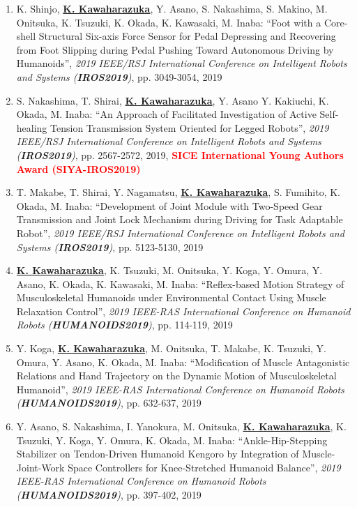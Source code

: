 \documentclass[letterpaper]{article}
\begin{document}
\begin{enumerate}
\item K. Shinjo, \underline{\textbf{K. Kawaharazuka}}, Y. Asano, S. Nakashima, S. Makino, M. Onitsuka, K. Tsuzuki, K. Okada, K. Kawasaki, M. Inaba: ``Foot with a Core-shell Structural Six-axis Force Sensor for Pedal Depressing and Recovering from Foot Slipping during Pedal Pushing Toward Autonomous Driving by Humanoids'', \textit{2019 IEEE/RSJ International Conference on Intelligent Robots and Systems (\textit{\textbf{IROS2019}})}, pp. 3049-3054, 2019
\item S. Nakashima, T. Shirai, \underline{\textbf{K. Kawaharazuka}}, Y. Asano Y. Kakiuchi, K. Okada, M. Inaba: ``An Approach of Facilitated Investigation of Active Self-healing Tension Transmission System Oriented for Legged Robots'', \textit{2019 IEEE/RSJ International Conference on Intelligent Robots and Systems (\textit{\textbf{IROS2019}})}, pp. 2567-2572, 2019, \textbf{\textcolor{red}{SICE International Young Authors Award (SIYA-IROS2019)}}
\item T. Makabe, T. Shirai, Y. Nagamatsu, \underline{\textbf{K. Kawaharazuka}}, S. Fumihito, K. Okada, M. Inaba: ``Development of Joint Module with Two-Speed Gear Transmission and Joint Lock Mechanism during Driving for Task Adaptable Robot'', \textit{2019 IEEE/RSJ International Conference on Intelligent Robots and Systems (\textit{\textbf{IROS2019}})}, pp. 5123-5130, 2019
\item \underline{\textbf{K. Kawaharazuka}}, K. Tsuzuki, M. Onitsuka, Y. Koga, Y. Omura, Y. Asano, K. Okada, K. Kawasaki, M. Inaba: ``Reflex-based Motion Strategy of Musculoskeletal Humanoids under Environmental Contact Using Muscle Relaxation Control'', \textit{2019 IEEE-RAS International Conference on Humanoid Robots (\textit{\textbf{HUMANOIDS2019}})}, pp. 114-119, 2019
\item Y. Koga, \underline{\textbf{K. Kawaharazuka}}, M. Onitsuka, T. Makabe, K. Tsuzuki, Y. Omura, Y. Asano, K. Okada, M. Inaba: ``Modification of Muscle Antagonistic Relations and Hand Trajectory on the Dynamic Motion of Musculoskeletal Humanoid'', \textit{2019 IEEE-RAS International Conference on Humanoid Robots (\textit{\textbf{HUMANOIDS2019}})}, pp. 632-637, 2019
\item Y. Asano, S. Nakashima, I. Yanokura, M. Onitsuka, \underline{\textbf{K. Kawaharazuka}}, K. Tsuzuki, Y. Koga, Y. Omura, K. Okada, M. Inaba: ``Ankle-Hip-Stepping Stabilizer on Tendon-Driven Humanoid Kengoro by Integration of Muscle-Joint-Work Space Controllers for Knee-Stretched Humanoid Balance'', \textit{2019 IEEE-RAS International Conference on Humanoid Robots (\textit{\textbf{HUMANOIDS2019}})}, pp. 397-402, 2019

\end{enumerate}
\end{document}
